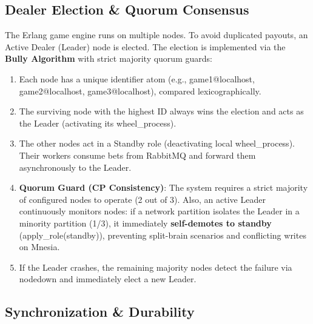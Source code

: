 \documentclass[12pt,a4paper]{article}
\begin{document}
\subsection{Dealer Election \& Quorum Consensus}
The Erlang game engine runs on multiple nodes. To avoid duplicated payouts, an Active Dealer (Leader) node is elected. The election is implemented via the \textbf{Bully Algorithm} with strict majority quorum guards:
\begin{enumerate}
    \item Each node has a unique identifier atom (e.g., game1@localhost, game2@localhost, game3@localhost), compared lexicographically.
    \item The surviving node with the highest ID always wins the election and acts as the Leader (activating its wheel\_\allowbreak process).
    \item The other nodes act in a Standby role (deactivating local wheel\_\allowbreak process). Their workers consume bets from RabbitMQ and forward them asynchronously to the Leader.
    \item \textbf{Quorum Guard (CP Consistency)}: The system requires a strict majority of configured nodes to operate (2 out of 3). Also, an active Leader continuously monitors nodes: if a network partition isolates the Leader in a minority partition (1/3), it immediately \textbf{self-demotes to standby} (apply\_\allowbreak role(standby)), preventing split-brain scenarios and conflicting writes on Mnesia.
    \item If the Leader crashes, the remaining majority nodes detect the failure via nodedown and immediately elect a new Leader.
\end{enumerate}

\subsection{Synchronization \& Durability}
\end{document}
